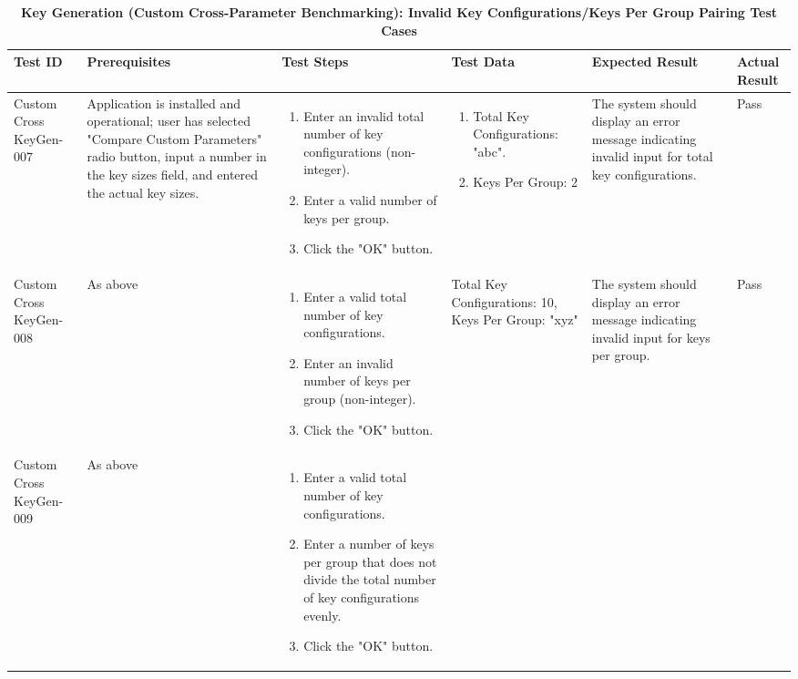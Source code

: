 \documentclass[]{final_report}
\theoremstyle{definition}
\begin{document}
\begin{longtable}{|p{1.5cm}|p{2.5cm}|p{3.5cm}|p{2.5cm}|p{3cm}|p{2cm}|}
  \caption{\textbf{Key Generation (Custom Cross-Parameter Benchmarking): Invalid Key Configurations/Keys Per Group Pairing Test Cases}} \\
  \hline
  \textbf{Test ID} & \textbf{Prerequisites} & \textbf{Test Steps} & \textbf{Test Data} & \textbf{Expected Result} & \textbf{Actual Result} \\
  \hline
  Custom
  Cross
  KeyGen-007 & Application is installed and operational; user has selected "Compare Custom Parameters" radio button, input a number in the key sizes field, and entered the actual key sizes. & 
  \begin{enumerate}
    \item Enter an invalid total number of key configurations (non-integer).
    \item Enter a valid number of keys per group.
    \item Click the "OK" button.
  \end{enumerate} & 
   \begin{enumerate}
    \item Total Key Configurations: "abc".
    \item Keys Per Group: 2
   \end{enumerate}  
  & The system should display an error message indicating invalid input for total key configurations. & Pass \\
  \hline
  Custom
  Cross
  KeyGen-008 & As above & 
  \begin{enumerate}
    \item Enter a valid total number of key configurations.
    \item Enter an invalid number of keys per group (non-integer).
    \item Click the "OK" button.
  \end{enumerate} & Total Key Configurations: 10, Keys Per Group: "xyz" & The system should display an error message indicating invalid input for keys per group. & Pass \\
  \hline
  Custom
  Cross
  KeyGen-009 & As above & 
  \begin{enumerate}
    \item Enter a valid total number of key configurations.
    \item Enter a number of keys per group that does not divide the total number of key configurations evenly.
    \item Click the "OK" button.

\end{enumerate}
\end{longtable}
\end{document}

